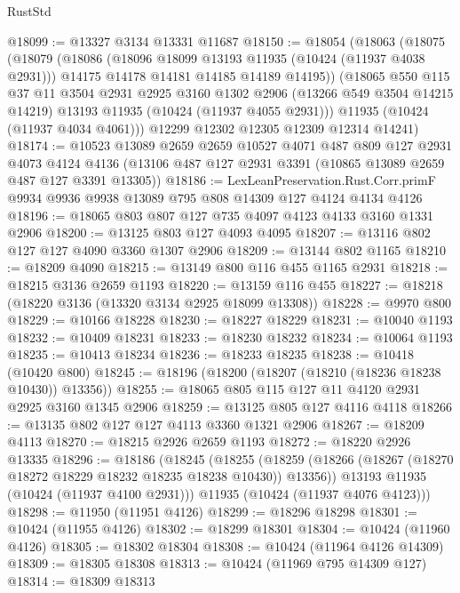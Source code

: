 \begin{lexlean}{RustStd}
\begin{coremodule}
@18099 := @13327 @3134 @13331 @11687
@18150 := @18054
    (@18063
      (@18075
        (@18079
          (@18086
            (@18096 @18099 @13193 @11935 (@10424 (@11937 @4038 @2931)))
            @14175
            @14178
            @14181
            @14185
            @14189
            @14195))
        (@18065
          @550
          @115
          @37
          @11
          @3504
          @2931
          @2925
          @3160
          @1302
          @2906
          (@13266 @549 @3504 @14215 @14219)
          @13193
          @11935
          (@10424 (@11937 @4055 @2931)))
        @11935
        (@10424 (@11937 @4034 @4061)))
      @12299
      @12302
      @12305
      @12309
      @12314
      @14241)
@18174 := @10523
    @13089
    @2659
    @2659
    @10527
    @4071
    @487
    @809
    @127
    @2931
    @4073
    @4124
    @4136
    (@13106 @487 @127 @2931 @3391 (@10865 @13089 @2659 @487 @127 @3391 @13305))
@18186 := LexLeanPreservation.Rust.Corr.primF
    @9934
    @9936
    @9938
    @13089
    @795
    @808
    @14309
    @127
    @4124
    @4134
    @4126
@18196 := @18065 @803 @807 @127 @735 @4097 @4123 @4133 @3160 @1331 @2906
@18200 := @13125 @803 @127 @4093 @4095
@18207 := @13116 @802 @127 @127 @4090 @3360 @1307 @2906
@18209 := @13144 @802 @1165
@18210 := @18209 @4090
@18215 := @13149 @800 @116 @455 @1165 @2931
@18218 := @18215 @3136 @2659 @1193
@18220 := @13159 @116 @455
@18227 := @18218 (@18220 @3136 (@13320 @3134 @2925 @18099 @13308))
@18228 := @9970 @800
@18229 := @10166 @18228
@18230 := @18227 @18229
@18231 := @10040 @1193
@18232 := @10409 @18231
@18233 := @18230 @18232
@18234 := @10064 @1193
@18235 := @10413 @18234
@18236 := @18233 @18235
@18238 := @10418 (@10420 @800)
@18245 := @18196 (@18200 (@18207 (@18210 (@18236 @18238 @10430)) @13356))
@18255 := @18065 @805 @115 @127 @11 @4120 @2931 @2925 @3160 @1345 @2906
@18259 := @13125 @805 @127 @4116 @4118
@18266 := @13135 @802 @127 @127 @4113 @3360 @1321 @2906
@18267 := @18209 @4113
@18270 := @18215 @2926 @2659 @1193
@18272 := @18220 @2926 @13335
@18296 := @18186
    (@18245
      (@18255
        (@18259 (@18266 (@18267 (@18270 @18272 @18229 @18232 @18235 @18238 @10430)) @13356))
        @13193
        @11935
        (@10424 (@11937 @4100 @2931)))
      @11935
      (@10424 (@11937 @4076 @4123)))
@18298 := @11950 (@11951 @4126)
@18299 := @18296 @18298
@18301 := @10424 (@11955 @4126)
@18302 := @18299 @18301
@18304 := @10424 (@11960 @4126)
@18305 := @18302 @18304
@18308 := @10424 (@11964 @4126 @14309)
@18309 := @18305 @18308
@18313 := @10424 (@11969 @795 @14309 @127)
@18314 := @18309 @18313

\end{coremodule}
\end{lexlean}
